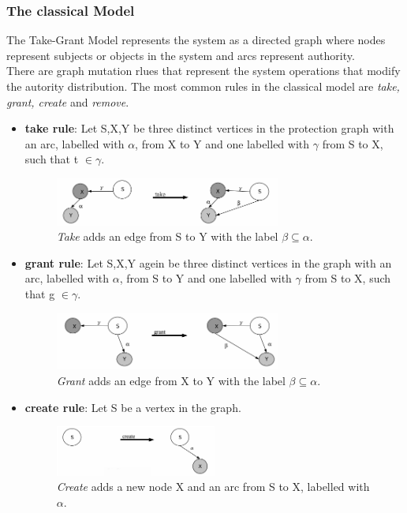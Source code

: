 \documentclass[pdftex,11pt,a4paper]{article}
\begin{document}
	\subsubsection{The classical Model}
	The Take-Grant Model \cite{TakeG} represents the system as a directed graph where nodes represent subjects or objects in the system and arcs represent authority. \\ 
	There are graph mutation rlues that represent the system operations that modify the autority distribution.
	The most common rules in the classical model are \textit{take, grant, create} and \textit{remove}. 
	
	\begin{itemize}
	\item \textbf{take rule}: Let S,X,Y be three distinct vertices in the protection graph with an arc, labelled with $\alpha$, from X to Y and one labelled with $\gamma$ from S to X, such that t $\in \gamma.$  
	\begin{figure}[ht]
	\centering
		\includegraphics[width=0.7\textwidth]{./Pictures/takeRule.png}
	\caption[take rule]{\textit{Take} adds an edge from S to Y with the label $\beta \subseteq \alpha$. \cite{TakeG}}
	\label{fig:cltake}
	\end{figure}		
	
	\item \textbf{grant rule}:	Let S,X,Y agein be three distinct vertices in the graph with an arc, labelled with  $\alpha$, from S to Y and one labelled with $\gamma$ from S to X, such that g $\in \gamma$. 
	\begin{figure}[ht]
	\centering
		\includegraphics[width=0.7\textwidth]{./Pictures/grantRule.png}
	\caption[grant rule]{\textit{Grant} adds an edge from X to Y with the label $\beta \subseteq \alpha$.  \cite{TakeG}}
	\label{fig:clgrant}
	\end{figure}		
	
	\item \textbf{create rule}: Let S be a vertex in the graph. 
	\begin{figure}[H]
	\centering
		\includegraphics[width=0.5\textwidth]{./Pictures/createRule.png}
	\caption[create rule]{\textit{Create} adds a new node X and an arc from S to X, labelled with $\alpha$. \cite{TakeG}}
	\label{fig:clcreate}
	\end{figure}	
	

\end{itemize}
\end{document}

